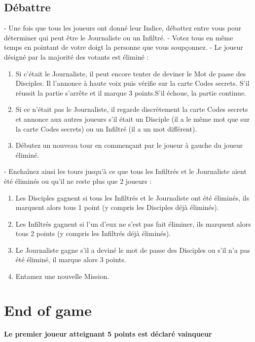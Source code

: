 \documentclass{article}%
\begin{document}
%
\subsection{ Débattre
}%
\label{subsec:Dbattre}%
{-} Une fois que tous les joueurs ont donné leur Indice, débattez entre vous pour déterminer qui peut être le Journaliste ou un Infiltré.
%
{-} Votez tous en même temps en pointant de votre doigt la personne que vous soupçonnez.
%
{-} Le joueur désigné par la majorité des votants est éliminé :
%
\begin{enumerate}%
\item%
 Si c’était le Journaliste, il peut encore tenter de deviner le Mot de passe des Disciples. Il l'annonce à haute voix puis vérifie sur la carte Codes secrets. S’il réussit la partie s’arrête et il marque 3 points.S’il échoue, la partie continue.
%
\item%
 Si ce n’était pas le Journaliste, il regarde discrètement la carte Codes secrets et annonce aux autres joueurs s’il était un Disciple (il a le même mot que sur la carte Codes secrets) ou un Infiltré (il a un mot différent).
%
\item%
Débutez un nouveau tour en commençant par le joueur à gauche du joueur éliminé.
%
\end{enumerate}%
{-} Enchaînez ainsi les tours jusqu’à ce que tous les Infiltrés et le Journaliste aient été éliminés ou qu’il ne reste plus que 2 joueurs :
%
\begin{enumerate}%
\item%
 Les Disciples gagnent si tous les Infiltrés et le Journaliste ont été éliminés, ils marquent alors tous 1 point (y compris les Disciples déjà éliminés).
%
\item%
 Les Infiltrés gagnent si l'un d'eux ne s'est pas fait éliminer, ils marquent alors tous 2 points (y compris les Infiltrés déjà éliminés).
%
\item%
 Le Journaliste gagne s'il a deviné le mot de passe des Disciples ou s'il n'a pas été éliminé, il marque alors 3 points.
%
\item%
Entamez une nouvelle Mission.
%
\end{enumerate}

%
\section{ End of game
}%
\label{sec:Endofgame}%
\textbf{Le premier joueur atteignant 5 points est déclaré vainqueur}

%
\end{document}
